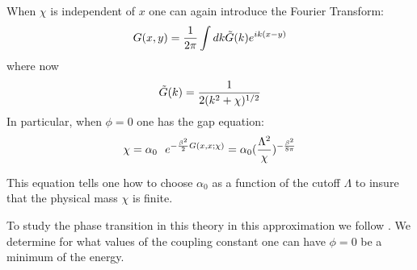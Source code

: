 \documentclass[a4paper,prd,preprint,superscriptaddress,showpacs,byrevtex]{revtex4}
\begin{document}
  When $\chi$ is
independent of $x$ one can again introduce the Fourier Transform:
\begin{equation}
G(x,y) = {1 \over 2 \pi} \int dk{\tilde G}(k) e^{i k(x-y)}
\end{equation}
where now
\[ \tilde{G} (k) = {1 \over 2 (k^2 + \chi)^{1/2}} \]
In particular, when $\phi=0$ one has the gap equation:
\begin{equation}
\chi = \alpha_0
~~e^{- {\beta^2 \over 2} G(x,x;\chi)} = \alpha_0
(\frac{\Lambda^2}{\chi})^{-\frac{\beta^2}{8\pi}}
\end{equation}

This equation tells one how to choose $\alpha_0$ as a function of the cutoff
$\Lambda$ to
insure  that the physical mass $\chi$ is finite.

To study the phase transition in this theory in this approximation we follow
\cite{ref:Coleman} \cite{ref:Boy}.   We determine for what values of
the coupling constant one can have $\phi=0$ be a minimum of  the energy.
\end{document}
